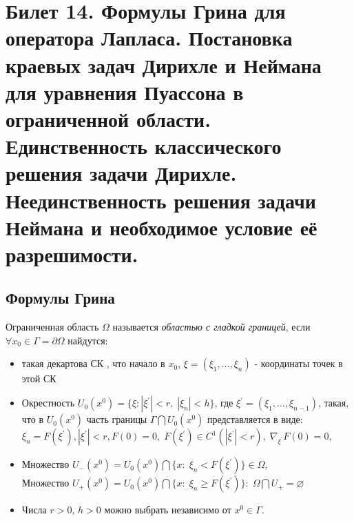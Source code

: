 \section{Билет 14. Формулы Грина для оператора Лапласа. Постановка краевых задач Дирихле и Неймана для уравнения Пуассона в ограниченной области. Единственность классического решения задачи Дирихле. Неединственность решения задачи Неймана и необходимое условие её разрешимости.}
\subsection{Формулы Грина}
\begin{definition}
Ограниченная область $\Omega$ называется \textit{областью с гладкой границей}, если $\forall x_0 \in \Gamma = \partial \Omega$ найдутся:
\begin{itemize}
\item такая декартова СК , что начало в $x_0$, $\xi = (\xi_1, \ldots, \xi_n)$ - координаты точек в этой СК
\item Окрестность $U_0(x^0) = \{\xi\colon |\xi^{'}| < r,\; |\xi_n| < h\}$, где $\xi^{'} = (\xi_1, \ldots, \xi_{n - 1})$, такая, что в $U_0(x^0)$ часть границы $\Gamma \bigcap U_0(x^0)$ представляется в виде: $\xi_n = F(\xi^{'}), |\xi^{'}| < r, F(0) = 0,\; F(\xi^{'}) \in C^1(|\xi^{'}| < r),\; \nabla_{\xi^{'}} F(0) = 0$, 
\item Множество $U_{-}(x^0) = U_0(x^0) \bigcap \{x\colon\; \xi_n < F(\xi^{'})\} \in \Omega$, \\
Множество $U_{+}(x^0) = U_0(x^0) \bigcap \{x\colon\; \xi_n \geq F(\xi^{'})\}\colon\; \Omega \bigcap U_{+} = \varnothing$
\item Числа $r > 0$, $h > 0$ можно выбрать независимо от $x^0 \in \Gamma$.
\end{itemize}
\end{definition}
